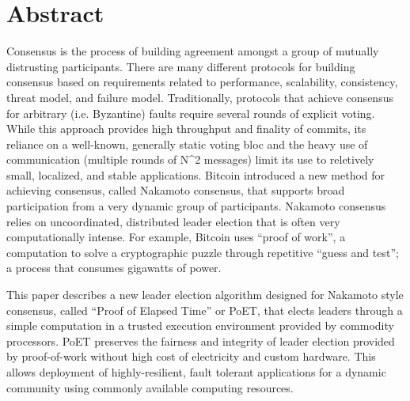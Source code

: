 \section{Abstract}
\label{sec_abstract}

Consensus is the process of building agreement amongst a group of mutually distrusting participants. There are many
different protocols for building consensus based on requirements related to performance, scalability, consistency,
threat model, and failure model. Traditionally, protocols that achieve consensus for arbitrary (i.e. Byzantine) faults
require several rounds of explicit voting. While this approach provides high throughput and finality of commits, its
reliance on a well-known, generally static voting bloc and the heavy use of communication (multiple rounds of N^2
messages) limit its use to reletively small, localized, and stable applications. Bitcoin introduced a new method for
achieving consensus, called Nakamoto consensus, that supports broad participation from a very dynamic group of
participants. Nakamoto consensus relies on uncoordinated, distributed leader election that is often very computationally
intense. For example, Bitcoin uses ``proof of work'', a computation to solve a cryptographic puzzle through repetitive
``guess and test''; a process that consumes gigawatts of power. 

This paper describes a new leader election algorithm designed for Nakamoto style consensus, called ``Proof of Elapsed
Time'' or PoET, that elects leaders through a simple computation in a trusted execution environment provided by
commodity processors. PoET preserves the fairness and integrity of leader election provided by proof-of-work without
high cost of electricity and custom hardware. This allows deployment of highly-resilient, fault tolerant applications
for a dynamic community using commonly available computing resources. 

